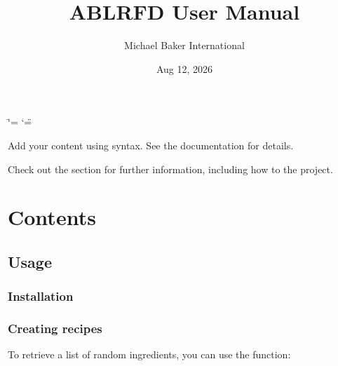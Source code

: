 \documentclass[letterpaper,11pt,english]{sphinxmanual}
\title{ABLRFD User Manual}
\date{Aug 12, 2026}
\author{Michael Baker International}
\begin{document}
\ifdefined\shorthandoff
  \ifnum\catcode`\=\string=\active\shorthandoff{=}\fi
  \ifnum\catcode`\"=\active{}\fi
\fi

\pagestyle{empty}
\sphinxmaketitle
\pagestyle{plain}
\sphinxtableofcontents
\pagestyle{normal}
\label{\detokenize{index::doc}}


\sphinxAtStartPar
Add your content using  syntax. See the
documentation for details.

\sphinxAtStartPar
Check out the {\hyperref[\detokenize{usage::doc}]{}} section for further information, including how to
{\hyperref[\detokenize{usage:installation}]{}} the project.


\chapter{Contents}
\label{\detokenize{index:contents}}
\sphinxstepscope


\section{Usage}
\label{\detokenize{usage:usage}}\label{\detokenize{usage::doc}}

\subsection{Installation}
\label{\detokenize{usage:installation}}\label{\detokenize{usage:id1}}

\subsection{Creating recipes}
\label{\detokenize{usage:creating-recipes}}
\sphinxAtStartPar
To retrieve a list of random ingredients,
you can use the  function:
\end{document}

